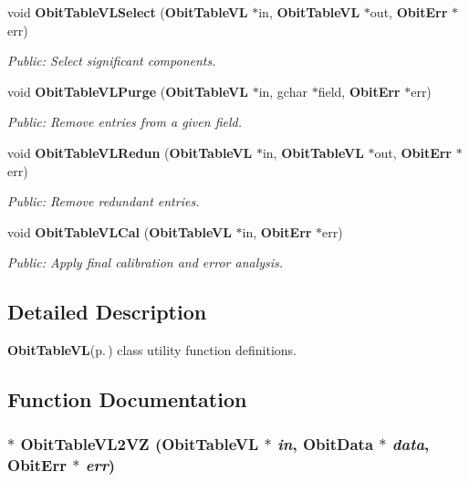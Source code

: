 \begin{CompactItemize}
void {\bf Obit\-Table\-VLSelect} ({\bf Obit\-Table\-VL} $\ast$in, {\bf Obit\-Table\-VL} $\ast$out, {\bf Obit\-Err} $\ast$err)
\begin{CompactList}\small\item\em Public: Select significant components. \item\end{CompactList}\item 
void {\bf Obit\-Table\-VLPurge} ({\bf Obit\-Table\-VL} $\ast$in, gchar $\ast$field, {\bf Obit\-Err} $\ast$err)
\begin{CompactList}\small\item\em Public: Remove entries from a given field. \item\end{CompactList}\item 
void {\bf Obit\-Table\-VLRedun} ({\bf Obit\-Table\-VL} $\ast$in, {\bf Obit\-Table\-VL} $\ast$out, {\bf Obit\-Err} $\ast$err)
\begin{CompactList}\small\item\em Public: Remove redundant entries. \item\end{CompactList}\item 
void {\bf Obit\-Table\-VLCal} ({\bf Obit\-Table\-VL} $\ast$in, {\bf Obit\-Err} $\ast$err)
\begin{CompactList}\small\item\em Public: Apply final calibration and error analysis. \item\end{CompactList}\end{CompactItemize}


\subsection{Detailed Description}
{\bf Obit\-Table\-VL}{\rm (p.\,\pageref{structObitTableVL})} class utility function definitions. 



\subsection{Function Documentation}
\subsubsection{$\ast$ Obit\-Table\-VL2VZ ({\bf Obit\-Table\-VL} $\ast$ {\em in}, {\bf Obit\-Data} $\ast$ {\em data}, {\bf Obit\-Err} $\ast$ {\em err})}\label{ObitTableVLUtil_8c_a10}



